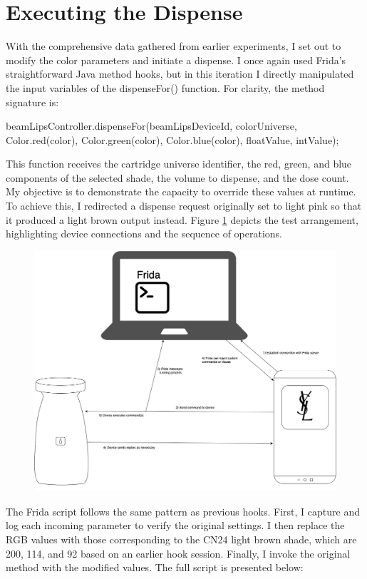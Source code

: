 \section{Executing the Dispense}
With the comprehensive data gathered from earlier experiments, I set out to modify the color parameters and initiate a dispense. I once again used Frida’s straightforward Java method hooks, but in this iteration I directly manipulated the input variables of the dispenseFor() function. For clarity, the method signature is:

beamLipsController.dispenseFor(beamLipsDeviceId, colorUniverse, Color.red(color), Color.green(color), Color.blue(color), floatValue, intValue);

This function receives the cartridge universe identifier, the red, green, and blue components of the selected shade, the volume to dispense, and the dose count. My objective is to demonstrate the capacity to override these values at runtime. To achieve this, I redirected a dispense request originally set to light pink so that it produced a light brown output instead. Figure \ref{fig:environmentsetup} depicts the test arrangement, highlighting device connections and the sequence of operations.

\begin{figure}[H]
	\centering
	\includegraphics[width=0.7\linewidth]{environmentsetup}
	\caption{}
	\label{fig:environmentsetup}
\end{figure}

The Frida script follows the same pattern as previous hooks. First, I capture and log each incoming parameter to verify the original settings. I then replace the RGB values with those corresponding to the CN24 light brown shade, which are 200, 114, and 92 based on an earlier hook session. Finally, I invoke the original method with the modified values. The full script is presented below:

